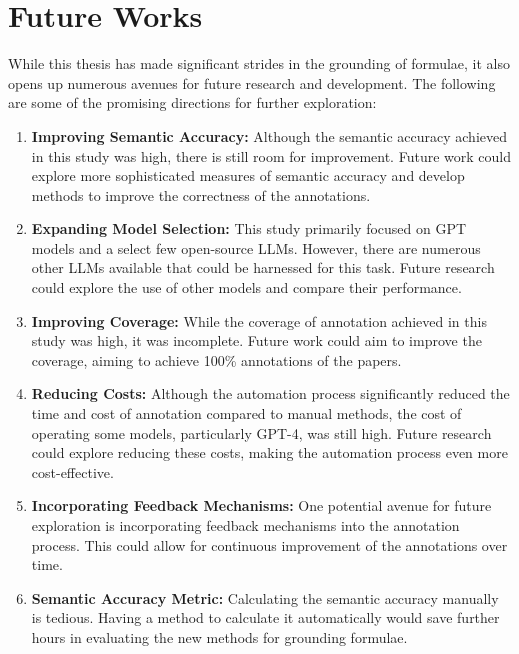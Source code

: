 \chapter{Future Works}\label{chapter:future_works}

While this thesis has made significant strides in the grounding of formulae, it also opens up numerous avenues for future research and development. The following are some of the promising directions for further exploration:

\begin{enumerate}

\item \textbf{Improving Semantic Accuracy:} Although the semantic accuracy achieved in this study was high, there is still room for improvement. Future work could explore more sophisticated measures of semantic accuracy and develop methods to improve the correctness of the annotations. 

\item \textbf{Expanding Model Selection:} This study primarily focused on GPT models and a select few open-source LLMs. However, there are numerous other LLMs available that could be harnessed for this task. Future research could explore the use of other models and compare their performance.

\item \textbf{Improving Coverage:} While the coverage of annotation achieved in this study was high, it was incomplete. Future work could aim to improve the coverage, aiming to achieve 100\% annotations of the papers.

\item \textbf{Reducing Costs:} Although the automation process significantly reduced the time and cost of annotation compared to manual methods, the cost of operating some models, particularly GPT-4, was still high. Future research could explore reducing these costs, making the automation process even more cost-effective.

\item \textbf{Incorporating Feedback Mechanisms:} One potential avenue for future exploration is incorporating feedback mechanisms into the annotation process. This could allow for continuous improvement of the annotations over time.

\item \textbf{Semantic Accuracy Metric:} Calculating the semantic accuracy manually is tedious. Having a method to calculate it automatically would save further hours in evaluating the new methods for grounding formulae.

\end{enumerate}

